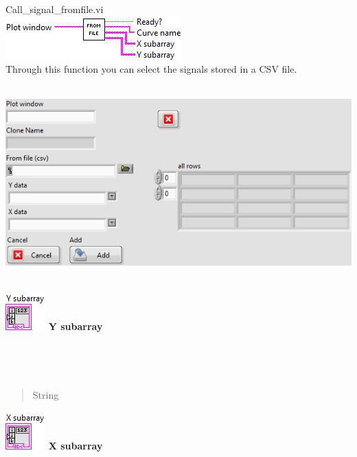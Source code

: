 \documentclass[
]{article}
\begin{document}
\hfill\break
Call\_signal\_fromfile.vi\\
\includegraphics{LVtemp20240312184738_13_0c.png}\\
Through this function you can select the signals stored in a CSV file.\\
\strut \\
\includegraphics{LVtemp20240312184738_14_0.png}\\
\strut \\
\includegraphics{LVtemp20240312184738_15_0.png} \textbf{Y subarray\\
}\strut \\
\strut \\

\begin{quote}
\hfill\break

String
\end{quote}

\hfill\break

\begin{quote}
\end{quote}

\hfill\break
\hfill\break
\includegraphics{LVtemp20240312184738_16_0.png} \textbf{X subarray\\
}\strut \\
\strut \\
\end{document}
